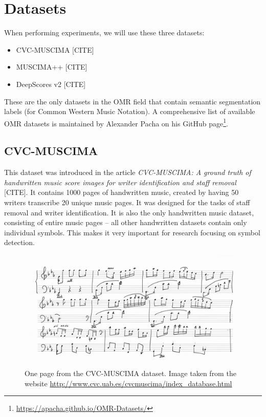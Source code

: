 \section{Datasets}
\label{sec:Datasets}

When performing experiments, we will use these three datasets:

\begin{itemize}
    \item CVC-MUSCIMA [CITE]
    \item MUSCIMA++ [CITE]
    \item DeepScores v2 [CITE]
\end{itemize}

These are the only datasets in the OMR field that contain semantic segmentation labels (for Common Western Music Notation). A comprehensive list of available OMR datasets is maintained by Alexander Pacha on his GitHub page\footnote{\url{https://apacha.github.io/OMR-Datasets/}}.


\subsection{CVC-MUSCIMA}

This dataset was introduced in the article \emph{CVC-MUSCIMA: A ground truth of handwritten music score images for writer identification and staff removal} [CITE]. It contains 1000 pages of handwritten music, created by having 50 writers transcribe 20 unique music pages. It was designed for the tasks of staff removal and writer identification. It is also the only handwritten music dataset, consisting of entire music pages -- all other handwritten datasets contain only individual symbols. This makes it very important for research focusing on symbol detection.

\begin{figure}[ht]
    \centering
    \includegraphics[width=140mm]{../img/cvc-muscima.png}
    \caption{One page from the CVC-MUSCIMA dataset. Image taken from the website \url{http://www.cvc.uab.es/cvcmuscima/index_database.html}}
    \label{fig:CvcMuscima}
\end{figure}

